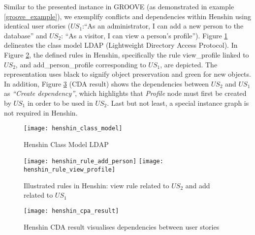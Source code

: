 \begin{example}
Similar to the presented instance in GROOVE (as demonstrated in example \ref{groove_example}), we exemplify conflicts and dependencies within Henshin using identical user stories ($US_1$:\enquote{As an administrator, I can add a new person to the database} and $US_2$: \enquote{As a visitor, I can view a person's profile}). Figure \ref{fig:henshin_model} delineates the  class model LDAP (Lightweight Directory Access Protocol). In Figure \ref{fig:henshin_rule}, the defined rules in Henshin, specifically the rule view\_profile linked to $US_2$, and add\_person\_profile corresponding to $US_1$, are depicted. The representation uses black to signify object preservation and green for new objects. In addition, Figure \ref{henshin_cpa_result} (CDA result) shows the dependencies between $US_2$ and $US_1$ as \emph{\enquote{Create dependency}}, which highlights that \emph{Profile} node must first be created by $US_1$ in order to be used in $US_2$. Last but not least, a special instance graph is not required in Henshin.
\begin{figure}
\center
\texttt{[image: henshin\_class\_model]}
\caption{Henshin Class Model LDAP}\label{fig:henshin_model}
\end{figure}
\begin{figure}
\texttt{[image: henshin\_rule\_add\_person]}
\texttt{[image: henshin\_rule\_view\_profile]}
\caption{Illustrated rules in Henshin: view rule related to $US_2$ and add related to $US_1$}\label{fig:henshin_rule}
\end{figure}
\begin{figure}
\center
\texttt{[image: henshin\_cpa\_result]}
\caption{Henshin CDA result visualises dependencies between user stories}\label{henshin_cpa_result}
\end{figure}
\end{example}
